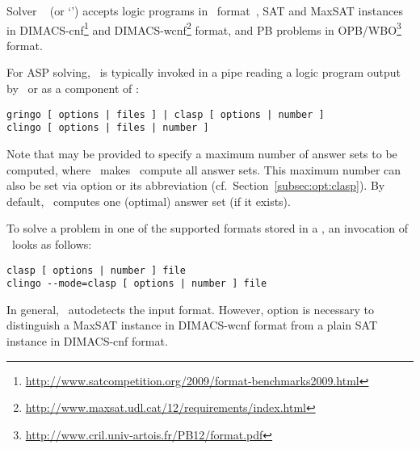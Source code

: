 Solver \clasp~\cite{gekanesc07b} (or `\clingo{}') accepts logic programs in \smodels\ format~\cite{lparseManual},
SAT and MaxSAT instances in DIMACS-cnf\footnote{\url{http://www.satcompetition.org/2009/format-benchmarks2009.html}}
and DIMACS-wcnf\footnote{\url{http://www.maxsat.udl.cat/12/requirements/index.html}} format,
and PB problems in OPB/WBO\footnote{\url{http://www.cril.univ-artois.fr/PB12/format.pdf}} format.

For ASP solving,
\clasp\ is typically invoked in a pipe reading
a logic program output by \gringo\
or as a component of \clingo:
%
\begin{lstlisting}[numbers=none]
gringo [ options | files ] | clasp [ options | number ]
clingo [ options | files | number ]
\end{lstlisting}
%
Note that  may be provided to specify a maximum number of answer sets
to be computed, where~\code{0} makes \clasp\ compute all answer sets.
This maximum number can also be set via
option  or its abbreviation 
(cf.\ Section~\ref{subsec:opt:clasp}).
By default, \clasp\ computes one (optimal) answer set (if it exists).

To solve a problem in one of the supported formats stored in a ,
an invocation of \clasp\ looks as follows:%
\begin{lstlisting}[numbers=none]
clasp [ options | number ] file
clingo --mode=clasp [ options | number ] file
\end{lstlisting}
In general, \clasp\ autodetects the input format. However,
option  is necessary to distinguish a
MaxSAT instance in DIMACS-wcnf format from a plain SAT instance
in  DIMACS-cnf format.

